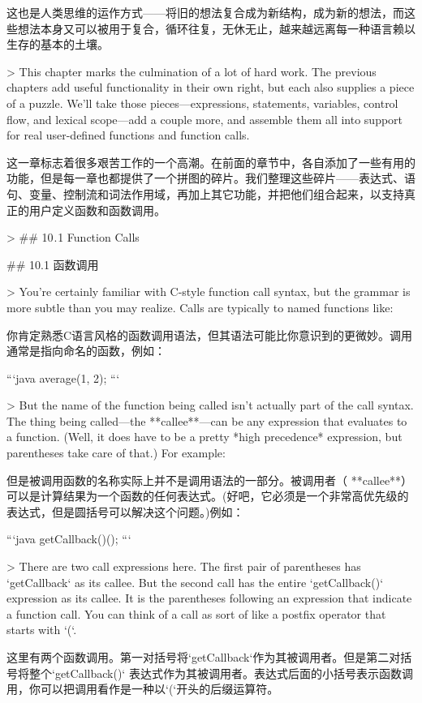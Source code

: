 \documentclass[cn,11pt,chinese]{elegantbook}
\begin{document}
{这也是人类思维的运作方式——将旧的想法复合成为新结构，成为新的想法，而这些想法本身又可以被用于复合，循环往复，无休无止，越来越远离每一种语言赖以生存的基本的土壤。

> This chapter marks the culmination of a lot of hard work. The previous chapters add useful functionality in their own right, but each also supplies a piece of a puzzle. We’ll take those pieces—expressions, statements, variables, control flow, and lexical scope—add a couple more, and assemble them all into support for real user-defined functions and function calls.

这一章标志着很多艰苦工作的一个高潮。在前面的章节中，各自添加了一些有用的功能，但是每一章也都提供了一个拼图的碎片。我们整理这些碎片——表达式、语句、变量、控制流和词法作用域，再加上其它功能，并把他们组合起来，以支持真正的用户定义函数和函数调用。

> ## 10 . 1 Function Calls

## 10.1 函数调用

> You’re certainly familiar with C-style function call syntax, but the grammar is more subtle than you may realize. Calls are typically to named functions like:

你肯定熟悉C语言风格的函数调用语法，但其语法可能比你意识到的更微妙。调用通常是指向命名的函数，例如：

```java
average(1, 2);
```

> But the name of the function being called isn’t actually part of the call syntax. The thing being called—the **callee**—can be any expression that evaluates to a function. (Well, it does have to be a pretty *high precedence* expression, but parentheses take care of that.) For example:

但是被调用函数的名称实际上并不是调用语法的一部分。被调用者（ **callee**）可以是计算结果为一个函数的任何表达式。(好吧，它必须是一个非常高优先级的表达式，但是圆括号可以解决这个问题。)例如：

```java
getCallback()();
```

> There are two call expressions here. The first pair of parentheses has `getCallback` as its callee. But the second call has the entire `getCallback()` expression as its callee. It is the parentheses following an expression that indicate a function call. You can think of a call as sort of like a postfix operator that starts with `(`.

这里有两个函数调用。第一对括号将`getCallback`作为其被调用者。但是第二对括号将整个`getCallback()` 表达式作为其被调用者。表达式后面的小括号表示函数调用，你可以把调用看作是一种以`(`开头的后缀运算符。

}
\end{document}
